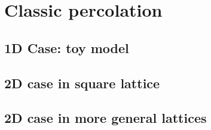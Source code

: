 
\chapter{Classic percolation}

\label{ch:classicpercolation} %



\section{1D Case: toy model}\label{sec:1d}



\section{2D case in square lattice}\label{sec:2dsquare}



\section{2D case in more general lattices}\label{sec:2dgeneral}
